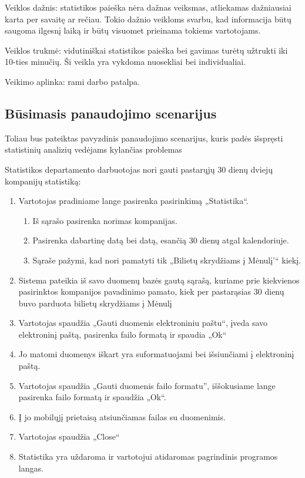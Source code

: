 \documentclass{VUMIFPSkursinis}
\begin{document}
Veiklos dažnis: statistikos paieška nėra dažnas veiksmas, atliekamas dažniausiai karta per savaitę ar rečiau. Tokio dažnio veikloms svarbu, kad informacija būtų saugoma ilgesnį laiką ir būtų visuomet prieinama tokiems vartotojams. 

Veiklos trukmė: vidutiniškai statistikos paieška bei gavimas turėtų užtrukti iki 10-ties minučių. Ši veikla yra vykdoma nuosekliai bei individualiai.

Veikimo aplinka: rami darbo patalpa. 

\subsection{Būsimasis panaudojimo scenarijus}
Toliau bus pateiktas pavyzdinis panaudojimo scenarijus, kuris padės išspręsti statistinių analizių vedėjams kylančias problemas

Statistikos departamento darbuotojas nori gauti pastarųjų 30 dienų dviejų kompanijų statistiką:
\begin{enumerate}
\item  Vartotojas pradiniame lange pasirenka pasirinkimą „Statistika“.
\begin{enumerate}[label*=\arabic*.]
\item Iš sąrašo pasirenka norimas kompanijas.
\item Pasirenka dabartinę datą bei datą, esančią 30 dienų atgal kalendoriuje.
\item Sąraše pažymi, kad nori pamatyti tik „Bilietų skrydžiams į Mėnulį'“ kiekį.
\end{enumerate}
\item Sistema pateikia iš savo duomenų bazės gautą sąrašą, kuriame prie kiekvienos pasirinktos kompanijos pavadinimo pamato, kiek per pastarąsias 30 dienų buvo parduota bilietų skrydžiams į Mėnulį
\item Vartotojas spaudžia „Gauti duomenis elektroniniu paštu“, įveda savo elektroninį paštą, pasirenka failo formatą ir spaudia „Ok“
\item Jo matomi duomenys iškart yra suformatuojami bei išsiunčiami į elektroninį paštą.
\item Vartotojas spaudžia „Gauti duomenis failo formatu'', iššokusiame lange pasirenka failo formatą ir spaudžia „Ok“.
\item Į jo mobilųjį prietaisą atsiunčiamas failas su duomenimis.
\item Vartotojas spaudžia „Close“
\item Statistika yra uždaroma ir vartotojui atidaromas pagrindinis programos langas.
\end{enumerate}
\end{document}
